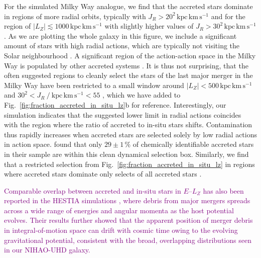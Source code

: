 \documentclass[fleqn,usenatbib]{mnras}
\newcommand{\changed}[1]{{\textcolor{purple}{#1}}}
\begin{document}
For the simulated Milky Way analogue, we find that the accreted stars dominate in regions of more radial orbits, typically with $J_R > 20^2\,\mathrm{kpc\,km\,s^{-1}}$ and for the region of $\vert L_Z \vert \lesssim 1000\,\mathrm{kpc\,km\,s^{-1}}$ with slightly higher values of $J_R > 30^2\,\mathrm{kpc\,km\,s^{-1}}$ . As we are plotting the whole galaxy in this figure, we include a significant amount of stars with high radial actions, which are typically not visiting the Solar neighbourhood \citep[compare Figs.~\ref{fig:lz_e_jr}e and \ref{fig:lz_e_jr}f and see for example][]{Feuillet2019}. A significant region of the action-action space in the Milky Way is populated by other accreted systems \citep[for example][]{Myeong2019, Naidu2020}. It is thus not surprising, that the often suggested regions to cleanly select the stars of the last major merger in the Milky Way have been restricted to a small window around $\vert L_Z \vert < 500\,\mathrm{kpc\,km\,s^{-1}}$ and $30^2 < J_R~/~\mathrm{kpc\,km\,s^{-1}} < 55$ \citep{Feuillet2021, Buder2022}, which we have added to Fig.~\ref{fig:fraction_accreted_in_situ_lz}b for reference. Interestingly, our simulation indicates that the suggested lower limit in radial actions coincides with the region where the ratio of accreted to in-situ stars shifts. Contamination thus rapidly increases when accreted stars are selected solely by low radial actions in action space. \citet{Buder2022} found that only $29 \pm 1\,\mathrm{\%}$ of chemically identifiable accreted stars in their sample are within this clean dynamical selection box. Similarly, we find that a restricted selection from Fig.~\ref{fig:fraction_accreted_in_situ_lz} in regions where accreted stars dominate only selects  of all accreted stars \citep[for a study of other selection criteria and their purity as well as completeness see][]{Carrillo2024}.

\changed{Comparable overlap between accreted and in-situ stars in $E$–$L_Z$ has also been reported in the HESTIA simulations \citep{Khoperskov2023b}, where debris from major mergers spreads across a wide range of energies and angular momenta as the host potential evolves. Their results further showed that the apparent position of merger debris in integral-of-motion space can drift with cosmic time owing to the evolving gravitational potential, consistent with the broad, overlapping distributions seen in our NIHAO-UHD galaxy.}
\end{document}

